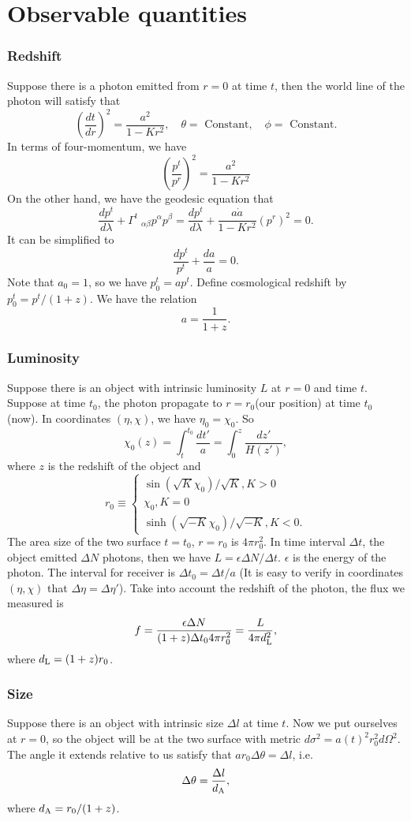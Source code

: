\section{Observable quantities}
\subsubsection{Redshift}
Suppose there is a photon emitted from $r=0$ at time $t$, then the world line of the photon will satisfy that
\[\left(\frac{dt}{dr}\right)^2 = \frac{a^2}{1-Kr^2}, \quad \theta = \mbox{ Constant}, \quad \phi = \mbox{ Constant}.\]
In terms of four-momentum, we have
\[\left(\frac{p^t}{p^r}\right)^2 = \frac{a^2}{1-Kr^2}\]
On the other hand, we have the geodesic equation that
\[\frac{dp^{t}}{d\lambda} + \Gamma^{t}_{\phantom{*}\alpha \beta} p^{\alpha}p^{\beta} = \frac{dp^{t}}{d\lambda} + \frac{a\dot{a}}{1-Kr^2}(p^r)^2 = 0.\]
It can be simplified to
\[\frac{dp^t}{p^t} + \frac{da}{a} = 0.\]
Note that $a_0 = 1$, so we have $p^t_0 = ap^t$. Define cosmological redshift by $p_0^t = p^t/(1+z)$. We have the relation
\[a = \frac{1}{1+z}.\]

\subsubsection{Luminosity}
Suppose there is an object with intrinsic luminosity $L$ at $r = 0$ and time $t$. Suppose at time $t_0$, the photon propagate to $r = r_0$(our position) at time $t_0$ (now). In coordinates $(\eta,\chi)$, we have $\eta_0 = \chi_0$. So
\[\chi_0(z) = \int_{t}^{t_0} \frac{dt'}{a} = \int_{0}^{z} \frac{dz'}{H(z')},\]
where $z$ is the redshift of the object and 
\[r_0 \equiv \begin{cases} 
\sin(\sqrt{K}\chi_0)/\sqrt{K}, K > 0 \\
\chi_0, K = 0 \\
\sinh(\sqrt{-K}\chi_0)/\sqrt{-K}, K < 0.
\end{cases}\]
The area size of the two surface $t=t_0$, $r=r_0$ is $4\pi r_0^2$. In time interval $\Delta t$, the object emitted $\Delta N$ photons, then we have $L = \epsilon \Delta N / \Delta t$. $\epsilon$ is the energy of the photon.
The interval for receiver is $\Delta t_0 = \Delta t / a$ (It is easy to verify in coordinates $(\eta,\chi)$ that $\Delta \eta = \Delta \eta'$). Take into account the redshift of the photon, the flux we measured is
\[f = \frac{\epsilon \Delta N}{(1+z)\Delta t_0 4\pi r_0^2} = \frac{L}{4\pi d_{\rm L}^2},\]
where $d_{\rm L} = (1+z)r_0$.

\subsubsection{Size}
Suppose there is an object with intrinsic size $\Delta l$ at time $t$. Now we put ourselves at $r = 0$, so the object will be at the two surface with metric $d\sigma^2 = a(t)^2 r_0^2 d\Omega^2$. The angle it extends relative to us satisfy that $ar_0\Delta\theta = \Delta l$, i.e.
\[\Delta \theta = \frac{\Delta l}{d_{\rm A}},\]
where $d_{\rm A} = r_0/(1+z)$.